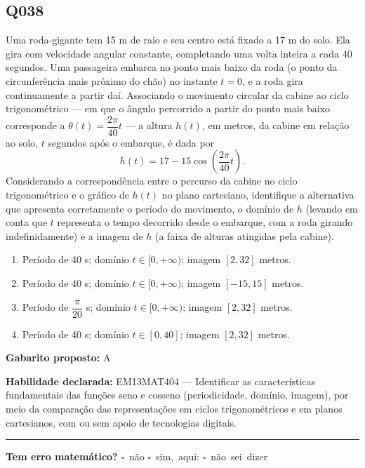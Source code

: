 \documentclass[11pt,a4paper]{article}
\begin{document}
\begin{samepage}
\subsection*{Q038}
Uma roda-gigante tem 15 m de raio e seu centro está fixado a 17 m do solo. Ela gira com velocidade angular constante, completando uma volta inteira a cada 40 segundos. Uma passageira embarca no ponto mais baixo da roda (o ponto da circunferência mais próximo do chão) no instante $t=0$, e a roda gira continuamente a partir daí. Associando o movimento circular da cabine ao ciclo trigonométrico — em que o ângulo percorrido a partir do ponto mais baixo corresponde a $\theta(t)=\dfrac{2\pi}{40}t$ — a altura $h(t)$, em metros, da cabine em relação ao solo, $t$ segundos após o embarque, é dada por
$$h(t) = 17 - 15\cos\left(\frac{2\pi}{40}t\right).$$
Considerando a correspondência entre o percurso da cabine no ciclo trigonométrico e o gráfico de $h(t)$ no plano cartesiano, identifique a alternativa que apresenta corretamente o período do movimento, o domínio de $h$ (levando em conta que $t$ representa o tempo decorrido desde o embarque, com a roda girando indefinidamente) e a imagem de $h$ (a faixa de alturas atingidas pela cabine).
\begin{enumerate}[label=(\alph*),nosep,leftmargin=*]
\item Período de 40 s; domínio $t \in [0, +\infty)$; imagem $[2, 32]$ metros.
\item Período de 40 s; domínio $t \in [0, +\infty)$; imagem $[-15, 15]$ metros.
\item Período de $\dfrac{\pi}{20}$ s; domínio $t \in [0, +\infty)$; imagem $[2, 32]$ metros.
\item Período de 40 s; domínio $t \in [0, 40]$; imagem $[2, 32]$ metros.
\end{enumerate}

\textbf{Gabarito proposto:} A

\textbf{Habilidade declarada:} EM13MAT404 --- Identificar as características fundamentais das funções seno e cosseno (periodicidade, domínio, imagem), por meio da comparação das representações em ciclos trigonométricos e em planos cartesianos, com ou sem apoio de tecnologias digitais.
\end{samepage}

\noindent\rule{\linewidth}{0.4pt}
\textbf{Tem erro matemático?}\quad
\mbox{$\square$~não} \quad \mbox{$\square$~sim, aqui:} \underline{\hspace{5cm}}
\quad \mbox{$\square$~não sei dizer}
\end{document}

